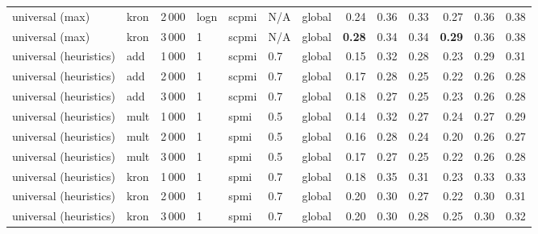 \begin{tabular}{lllllllrrrrrr}
universal (max)        & kron & 2\,000 & logn & scpmi & N/A & global &         0.24 &          0.36 &           0.33 &            0.27 &             0.36 &        0.38 \\
universal (max)        & kron & 3\,000 & 1    & scpmi & N/A & global &         \textbf{0.28} &          0.34 &           0.34 &            \textbf{0.29} &             0.36 &        0.38 \\ \addlinespace
universal (heuristics) & add  & 1\,000 & 1    & scpmi & 0.7 & global &         0.15 &          0.32 &           0.28 &            0.23 &             0.29 &        0.31 \\
universal (heuristics) & add  & 2\,000 & 1    & scpmi & 0.7 & global &         0.17 &          0.28 &           0.25 &            0.22 &             0.26 &        0.28 \\
universal (heuristics) & add  & 3\,000 & 1    & scpmi & 0.7 & global &         0.18 &          0.27 &           0.25 &            0.23 &             0.26 &        0.28 \\ \addlinespace
universal (heuristics) & mult & 1\,000 & 1    & spmi  & 0.5 & global &         0.14 &          0.32 &           0.27 &            0.24 &             0.27 &        0.29 \\
universal (heuristics) & mult & 2\,000 & 1    & spmi  & 0.5 & global &         0.16 &          0.28 &           0.24 &            0.20 &             0.26 &        0.27 \\
universal (heuristics) & mult & 3\,000 & 1    & spmi  & 0.5 & global &         0.17 &          0.27 &           0.25 &            0.22 &             0.26 &        0.28 \\ \addlinespace
universal (heuristics) & kron & 1\,000 & 1    & spmi  & 0.7 & global &         0.18 &          0.35 &           0.31 &            0.23 &             0.33 &        0.33 \\
universal (heuristics) & kron & 2\,000 & 1    & spmi  & 0.7 & global &         0.20 &          0.30 &           0.27 &            0.22 &             0.30 &        0.31 \\
universal (heuristics) & kron & 3\,000 & 1    & spmi  & 0.7 & global &         0.20 &          0.30 &           0.28 &            0.25 &             0.30 &        0.32 \\
\bottomrule
\end{tabular}

